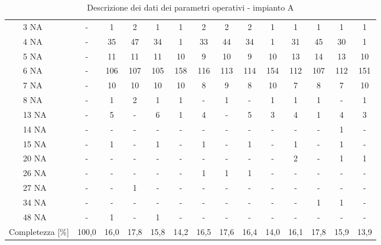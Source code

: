 \begin{sidewaystable}
\begin{center}
\begin{tabular}{|ll|c|c|c|c|c|c|c|c|c|c|c|c|c|}
		& 3 NA       & -   & 1      & 2      & 1     & 1       & 2      & 2      & 2     & 1       & 1      & 1      & 1     & 1       \\ \cline{3-15} 
		& 4 NA       & -    & 35     & 47     & 34    & 1       & 33     & 44     & 34    & 1       & 31     & 45     & 30    & 1       \\ \cline{3-15} 
		& 5 NA       & -    & 11     & 11     & 11    & 10      & 9      & 10     & 9     & 10      & 13     & 14     & 13    & 10      \\ \cline{3-15} 
		& 6 NA       & -   & 106    & 107    & 105   & 158     & 116    & 113    & 114   & 154     & 112    & 107    & 112   & 151     \\ \cline{3-15} 
		& 7 NA       & -    & 10     & 10     & 10    & 10      & 8      & 9      & 8     & 10      & 7      & 8      & 7     & 10      \\ \cline{3-15} 
		& 8 NA       & -    & 1      & 2      & 1     & 1       & -      & 1      & -     & 1       & 1      & 1      & -     & 1       \\ \cline{3-15} 
		& 13 NA      & -    & 5      & -      & 6     & 1       & 4      & -      & 5     & 3       & 4      & 1      & 4     & 3       \\ \cline{3-15} 
		& 14 NA      & -    & -      & -      & -     & -       & -      & -      & -     & -       & -      & -      & 1     & -       \\ \cline{3-15} 
		& 15 NA      & -    & 1      & -      & 1     & -       & 1      & -      & 1     & -       & 1      & -      & 1     & -       \\ \cline{3-15} 
		& 20 NA      & -    & -      & -      & -     & -       & -      & -      & -     & -       & 2      & -      & 1     & 1       \\ \cline{3-15} 
		& 26 NA      & -    & -      & -      & -     & -       & 1      & 1      & 1     & -       & -      & -      & -     & -       \\ \cline{3-15} 
		& 27 NA      & -    & -      & 1      & -     & -       & -      & -      & -     & -       & -      & -      & -     & -       \\ \cline{3-15} 
		& 34 NA      & -    & -      & -      & -     & -       & -      & -      & -     & -       & -      & 1      & 1     & -       \\ \cline{3-15} 
		& 48 NA      & -    & 1      & -      & 1     & -       & -      & -      & -     & -       & -      & -      & -     & -       \\ \hline
		\multicolumn{2}{|l|}{Completezza {[}\%{]}}       & 100,0 & 16,0   & 17,8   & 15,8  & 14,2    & 16,5   & 17,6   & 16,4  & 14,0    & 16,1   & 17,8   & 15,9  & 13,9    \\ \hline
	\end{tabular}
	\caption{Descrizione dei dati dei parametri operativi - impianto A}
	\label{tab:sa_NApar-op}
\end{center}
\end{sidewaystable}


